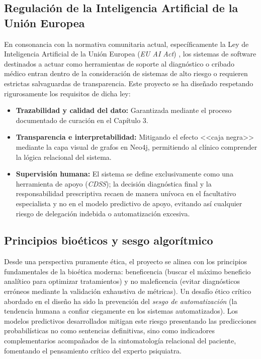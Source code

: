 \documentclass[12pt,a4paper,onecolumn,oneside]{report}
\begin{document}
\subsection{Regulación de la Inteligencia Artificial de la Unión Europea}
En consonancia con la normativa comunitaria actual, específicamente la Ley de Inteligencia Artificial de la Unión Europea (\textit{EU AI Act}) \cite{ai_act}, los sistemas de software destinados a actuar como herramientas de soporte al diagnóstico o cribado médico entran dentro de la consideración de sistemas de alto riesgo o requieren estrictas salvaguardas de transparencia. Este proyecto se ha diseñado respetando rigurosamente los requisitos de dicha ley:
\begin{itemize}
    \item \textbf{Trazabilidad y calidad del dato:} Garantizada mediante el proceso documentado de curación en el Capítulo 3.
    \item \textbf{Transparencia e interpretabilidad:} Mitigando el efecto <<caja negra>> mediante la capa visual de grafos en Neo4j, permitiendo al clínico comprender la lógica relacional del sistema.
    \item \textbf{Supervisión humana:} El sistema se define exclusivamente como una herramienta de apoyo (\textit{CDSS}); la decisión diagnóstica final y la responsabilidad prescriptiva recaen de manera unívoca en el facultativo especialista y no en el modelo predictivo de apoyo, evitando así cualquier riesgo de delegación indebida o automatización excesiva.
\end{itemize}

\subsection{Principios bioéticos y sesgo algorítmico}
Desde una perspectiva puramente ética, el proyecto se alinea con los principios fundamentales de la bioética moderna: beneficencia (buscar el máximo beneficio analítico para optimizar tratamientos) y no maleficencia (evitar diagnósticos erróneos mediante la validación exhaustiva de métricas). Un desafío ético crítico abordado en el diseño ha sido la prevención del \textit{sesgo de automatización} (la tendencia humana a confiar ciegamente en los sistemas automatizados). Los modelos predictivos desarrollados mitigan este riesgo presentando las predicciones probabilísticas no como sentencias definitivas, sino como indicadores complementarios acompañados de la sintomatología relacional del paciente, fomentando el pensamiento crítico del experto psiquiatra.
\end{document}

